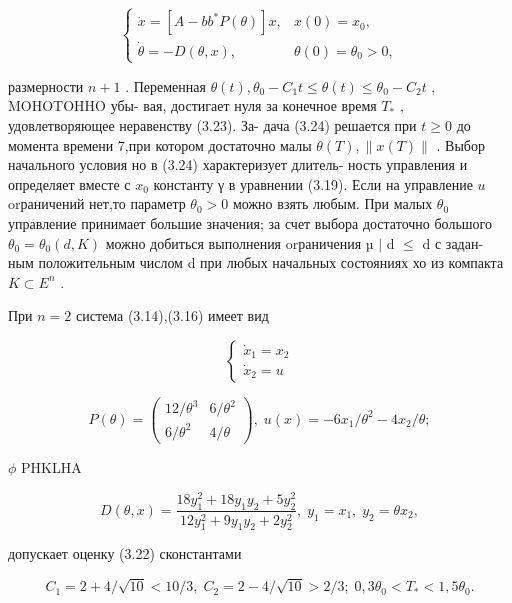 \documentclass[10pt]{article}
\begin{document}
\[
\left\{  \begin{array}{ll} \dot{x} = \left[  {A - b{b}^{ * }P\left( \theta \right) }\right]  x, & x\left( 0\right)  = {x}_{0}, \\  \dot{\theta } =  - D\left( {\theta ,x}\right) , & \theta \left( 0\right)  = {\theta }_{0} > 0, \end{array}\right. \tag{3.24}
\]

размерности \(n + 1\) . Переменная \(\theta \left( t\right) ,{\theta }_{0} - {C}_{1}t \leq  \theta \left( t\right)  \leq  {\theta }_{0} - {C}_{2}t\) , MOHOTOHHO убы- вая, достигает нуля за конечное время \({T}_{ * }\) , удовлетворяющее неравенству (3.23). За- дача (3.24) решается при \(t \geq  0\) до момента времени 7,при котором достаточно малы \(\theta \left( T\right) ,\parallel x\left( T\right) \parallel\) . Выбор начального условия но в (3.24) характеризует длитель- ность управления и определяет вместе с \({x}_{0}\) константу γ в уравнении (3.19). Если на управление \(u\) orраничений нет,то параметр \({\theta }_{0} > 0\) можно взять любым. При малых \({\theta }_{0}\) управление принимает большие значения; за счет выбора достаточно большого \({\theta }_{0} = {\theta }_{0}\left( {d,K}\right)\) можно добиться выполнения orраничения µ \(|\) d \(\leq\) d с задан- ным положительным числом d при любых начальных состояниях хо из компакта \(K \subset  {E}^{n}\) .

При \(n = 2\) система (3.14),(3.16) имеет вид

\[
\left\{  \begin{array}{l} {\dot{x}}_{1} = {x}_{2} \\  {\dot{x}}_{2} = u \end{array}\right.
\]

\[
P\left( \theta \right)  = \left( \begin{array}{cc} {12}/{\theta }^{3} & 6/{\theta }^{2} \\  6/{\theta }^{2} & 4/\theta \end{array}\right) ,\;u\left( x\right)  =  - 6{x}_{1}/{\theta }^{2} - 4{x}_{2}/\theta ;
\]

\(\phi\) PHKLHA

\[
D\left( {\theta ,x}\right)  = \frac{{18}{y}_{1}^{2} + {18}{y}_{1}{y}_{2} + 5{y}_{2}^{2}}{{12}{y}_{1}^{2} + 9{y}_{1}{y}_{2} + 2{y}_{2}^{2}},\;{y}_{1} = {x}_{1},\;{y}_{2} = \theta {x}_{2},
\]

допускает оценку (3.22) сконстантами

\[
{C}_{1} = 2 + 4/\sqrt{10} < {10}/3,\;{C}_{2} = 2 - 4/\sqrt{10} > 2/3;\;0,3{\theta }_{0} < {T}_{ * } < 1,5{\theta }_{0}.
\]
\end{document}
